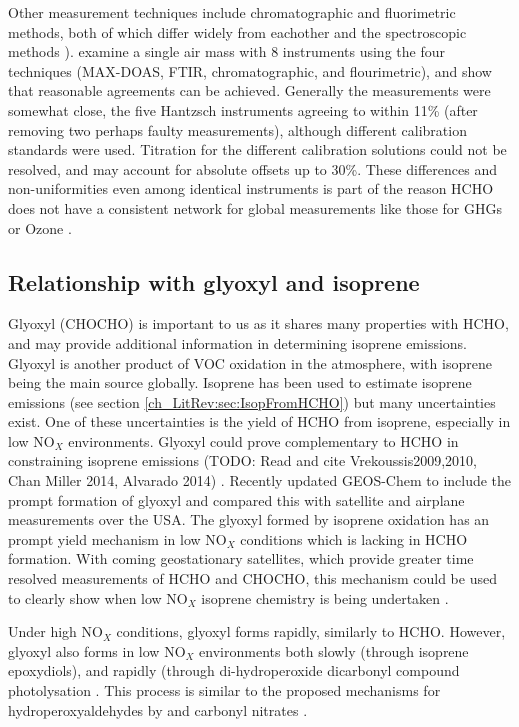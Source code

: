    Other measurement techniques include chromatographic and fluorimetric methods, both of which differ widely from eachother and the spectroscopic methods \citep{Hak2005}).
    \cite{Hak2005} examine a single air mass with 8 instruments using the four techniques (MAX-DOAS, FTIR, chromatographic, and flourimetric), and show that reasonable agreements can be achieved.
    Generally the measurements were somewhat close, the five Hantzsch instruments agreeing to within 11\% (after removing two perhaps faulty measurements), although different calibration standards were used.
    Titration for the different calibration solutions could not be resolved, and may account for absolute offsets up to 30\%.
    These differences and non-uniformities even among identical instruments is part of the reason HCHO does not have a consistent network for global measurements like those for GHGs or Ozone \citep{FortemsCheiney2012}.
    
  \subsection{Relationship with glyoxyl and isoprene}
    Glyoxyl (CHOCHO) is important to us as it shares many properties with HCHO, and may provide additional information in determining isoprene emissions.
    Glyoxyl is another product of VOC oxidation in the atmosphere, with isoprene being the main source globally.
    Isoprene has been used to estimate isoprene emissions (see section \ref{ch_LitRev:sec:IsopFromHCHO}) but many uncertainties exist.
    One of these uncertainties is the yield of HCHO from isoprene, especially in low NO$_X$ environments.
    Glyoxyl could prove complementary to HCHO in constraining isoprene emissions (TODO: Read and cite Vrekoussis2009,2010, Chan Miller 2014, Alvarado 2014) \citep{Miller2017}.
    Recently \cite{Miller2017} updated GEOS-Chem to include the prompt formation of glyoxyl and compared this with satellite and airplane measurements over the USA.
    The glyoxyl formed by isoprene oxidation has an prompt yield mechanism in low NO$_X$ conditions which is lacking in HCHO formation.
    With coming geostationary satellites, which provide greater time resolved measurements of HCHO and CHOCHO, this mechanism could be used to clearly show when low NO$_X$ isoprene chemistry is being undertaken \citep{Miller2017}.
    
    Under high NO$_X$ conditions, glyoxyl forms rapidly, similarly to HCHO.
    However, glyoxyl also forms in low NO$_X$ environments both slowly (through isoprene epoxydiols), and rapidly (through di-hydroperoxide dicarbonyl compound photolysation \citep{Crounse2013}.
    This process is similar to the proposed mechanisms for hydroperoxyaldehydes by \citet{Peeters2014} and carbonyl nitrates \citep{Muller2014}.
    
